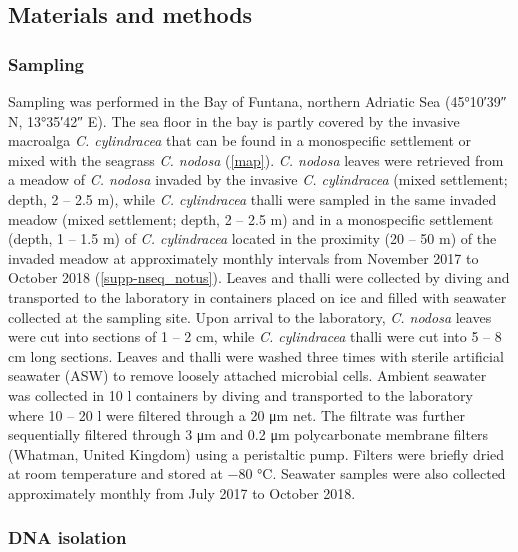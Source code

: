 \documentclass[
  12pt,
]{article}
\begin{document}
\newpage

\hypertarget{materials-and-methods}{%
\subsection{Materials and methods}\label{materials-and-methods}}

\hypertarget{sampling}{%
\subsubsection{Sampling}\label{sampling}}

Sampling was performed in the Bay of Funtana, northern Adriatic Sea
(\ang{45;10;39} N, \ang{13;35;42} E). The sea floor in the bay is partly
covered by the invasive macroalga \emph{C. cylindracea} that can be
found in a monospecific settlement or mixed with the seagrass \emph{C.
nodosa} (\autoref{map}). \emph{C. nodosa} leaves were retrieved from a
meadow of \emph{C. nodosa} invaded by the invasive \emph{C. cylindracea}
(mixed settlement; depth, 2 -- 2.5 \si{\m}), while \emph{C. cylindracea}
thalli were sampled in the same invaded meadow (mixed settlement; depth,
2 -- 2.5 \si{\m}) and in a monospecific settlement (depth, 1 -- 1.5
\si{\m}) of \emph{C. cylindracea} located in the proximity (20 -- 50
\si{\m}) of the invaded meadow at approximately monthly intervals from
November 2017 to October 2018 (\autoref{supp-nseq_notus}). Leaves and
thalli were collected by diving and transported to the laboratory in
containers placed on ice and filled with seawater collected at the
sampling site. Upon arrival to the laboratory, \emph{C. nodosa} leaves
were cut into sections of 1 -- 2 \si{\cm}, while \emph{C. cylindracea}
thalli were cut into 5 -- 8 \si{\cm} long sections. Leaves and thalli
were washed three times with sterile artificial seawater (ASW) to remove
loosely attached microbial cells. Ambient seawater was collected in 10
\si{\l} containers by diving and transported to the laboratory where 10
-- 20 \si{\l} were filtered through a 20 \si{\um} net. The filtrate was
further sequentially filtered through 3 \si{\um} and 0.2 \si{\um}
polycarbonate membrane filters (Whatman, United Kingdom) using a
peristaltic pump. Filters were briefly dried at room temperature and
stored at \num{-80} \si{\degreeCelsius}. Seawater samples were also
collected approximately monthly from July 2017 to October 2018.

\hypertarget{dna-isolation}{%
\subsubsection{DNA isolation}\label{dna-isolation}}
\end{document}
